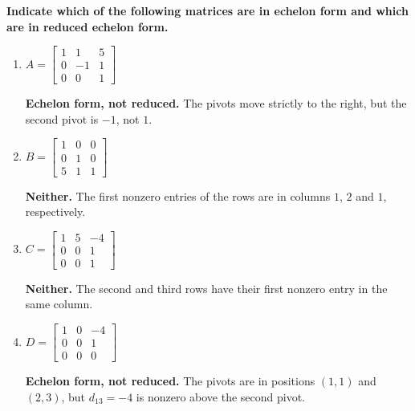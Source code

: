
\item {\bfseries\boldmath
    Indicate which of the following matrices are in
    echelon form and which are in reduced echelon form.
}

\begin{enumerate}[label=\alph*)]

    \item $A=
    \begin{bmatrix}
        1&1&5\\
        0&-1&1\\
        0&0&1
    \end{bmatrix}$

    \begin{answer}
        \textbf{Echelon form, not reduced.}
        The pivots move strictly to the right,
        but the second pivot is $-1$, not $1$.
    \end{answer}

    \item $B=
    \begin{bmatrix}
        1&0&0\\
        0&1&0\\
        5&1&1
    \end{bmatrix}$

    \begin{answer}
        \textbf{Neither.}
        The first nonzero entries of the rows
        are in columns $1$, $2$ and $1$,
        respectively.
    \end{answer}

    \item $C=
    \begin{bmatrix}
        1&5&-4\\
        0&0&1\\
        0&0&1
    \end{bmatrix}$

    \begin{answer}
        \textbf{Neither.}
        The second and third rows have
        their first nonzero entry in the same column.
    \end{answer}

    \item $D=
    \begin{bmatrix}
        1&0&-4\\
        0&0&1\\
        0&0&0
    \end{bmatrix}$

    \begin{answer}
        \textbf{Echelon form, not reduced.}
        The pivots are in positions $(1,1)$ and $(2,3)$,
        but $d_{13}=-4$ is nonzero above the second pivot.
    \end{answer}


\end{enumerate}
